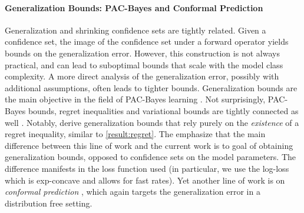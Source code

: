 \paragraph{Generalization Bounds: PAC-Bayes and Conformal Prediction}
Generalization and shrinking confidence sets are tightly related. Given a confidence set, the image of the confidence set under a forward operator yields bounds on the generalization error. However, this construction is not always practical, and can lead to suboptimal bounds that scale with the model class complexity. A more direct analysis of the generalization error, possibly with additional assumptions, often leads to tighter bounds. Generalization bounds are the main objective in the field of PAC-Bayes learning \citep[e.g.,][]{alquier2024user}. Not surprisingly, PAC-Bayes bounds, regret inequalities and variational bounds are tightly connected as well \citep{lugosi2022generalization,haddouche2022online,chugg2023unified}. Notably, \citet{lugosi2023online} derive generalization bounds that rely purely on the \emph{existence} of a regret inequality, similar to \cref{result:regret}. The emphasize that the main difference between this line of work and the current work is to goal of obtaining generalization bounds, opposed to confidence sets on the model parameters. The difference manifests in the loss function used (in particular, we use the log-loss which is exp-concave and allows for fast rates). Yet another line of work is on \emph{conformal prediction} \citep{angelopoulos2021gentle,angelopoulos2024theoretical}, which again targets the generalization error in a distribution free setting.







